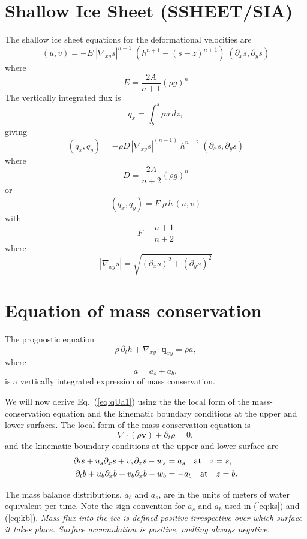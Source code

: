 \documentclass[10pt,a4paper]{book}
\newcommand{\p}{\partial}
\begin{document}
\section{Shallow Ice Sheet (SSHEET/SIA)}

The shallow ice sheet equations for the deformational velocities are
\[
(u,v)=-E \; |\nabla_{xy} s|^{n-1} \; \left (h^{n+1}-(s-z)^{n+1} \right ) \;(\p_x s,\p_y s)
\]
where
\[ 
E=\frac{2 A}{n+1}  (\rho g)^n 
\] 
The vertically integrated flux is
\[
q_x=\int_b^s \rho u \, dz ,
\]
giving
\[
(q_x,q_y)=-\rho D\,  |\nabla_{xy} s|^{(n-1)} \; h^{n+2} \; (\p_x s , \p_y s)
\]
where
\[
D=\frac{2 A }{n+2}  (\rho g)^n
\]
or
\[
(q_x,q_y)=F \; \rho \, h\,  (u,v)
\]
with
\[
F=\frac{n+1}{n+2}
\]
where
\[
|\nabla_{xy} s|=\sqrt{(\p_x s)^2+(\p_y s)^2}
\]





\section{Equation of mass conservation}

The prognostic equation
\begin{equation}
\rho \, \p_t h + \nabla_{xy} \cdot \bm{q}_{xy} = \rho a     ,\label{eq:qUa1}
\end{equation}
where
\[
a=a_s+a_b , 
\]
is a vertically integrated expression of mass
conservation.


We will now derive Eq.~(\ref{eq:qUa1}) using the the local form of the
mass-conservation equation and the kinematic boundary conditions at
the upper and lower surfaces. The local form of the mass-conservation equation is
\begin{equation}
\nabla \cdot (\rho \bm{v})+ \p_t \rho =0,
\label{eq:mgen}
\end{equation}
and the kinematic boundary conditions at the upper and lower surface are 
\begin{align}
\p_t s + u_s \p_x s + v_s \p_x s - w_s &= a_s \quad \hbox{at} \quad z=s ,\label{eq:ks} \\
\p_t b + u_b \p_x b + v_b \p_x b - w_b &= -a_b \quad \hbox{at} \quad z=b .\label{eq:kb}
\end{align}


The mass balance distributions, $a_b$ and $a_s$, are in the units of
meters of water equivalent per time. Note the sign convention for
$a_s$ and $a_b$ used in (\ref{eq:ks}) and (\ref{eq:kb}). {\em Mass flux into
the ice is defined positive irrespective over which surface it takes
place. Surface accumulation is positive, melting always negative.}
\end{document}
